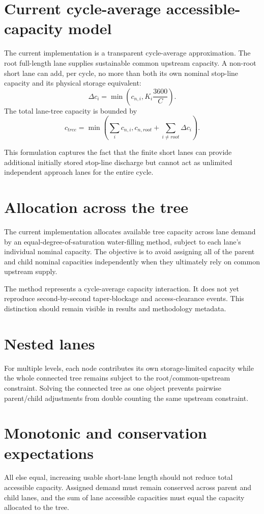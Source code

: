 \section{Current cycle-average accessible-capacity model}
The current implementation is a transparent cycle-average approximation.  The root
full-length lane supplies sustainable common upstream capacity.  A non-root short lane
can add, per cycle, no more than both its own nominal stop-line capacity and its physical
storage equivalent:
\begin{equation}
\Delta c_i=\min\left(c_{n,i},K_i\frac{3600}{C}\right).
\end{equation}
The total lane-tree capacity is bounded by
\begin{equation}
c_{tree}=\min\left(
\sum_i c_{n,i},
 c_{n,root}+\sum_{i\neq root}\Delta c_i
\right).
\end{equation}

This formulation captures the fact that the finite short lanes can provide additional
initially stored stop-line discharge but cannot act as unlimited independent approach
lanes for the entire cycle.

\section{Allocation across the tree}
The current implementation allocates available tree capacity across lane demand by an
equal-degree-of-saturation water-filling method, subject to each lane's individual
nominal capacity.  The objective is to avoid assigning all of the parent and child
nominal capacities independently when they ultimately rely on common upstream supply.

The method represents a cycle-average capacity interaction.  It does not yet reproduce
second-by-second taper-blockage and access-clearance events.  This distinction should
remain visible in results and methodology metadata.

\section{Nested lanes}
For multiple levels, each node contributes its own storage-limited capacity while the
whole connected tree remains subject to the root/common-upstream constraint.  Solving
the connected tree as one object prevents pairwise parent/child adjustments from double
counting the same upstream constraint.

\section{Monotonic and conservation expectations}
All else equal, increasing usable short-lane length should not reduce total accessible
capacity.  Assigned demand must remain conserved across parent and child lanes, and the
sum of lane accessible capacities must equal the capacity allocated to the tree.

